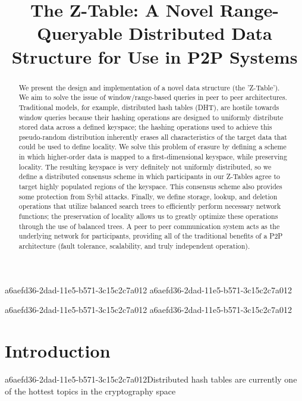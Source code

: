\documentclass[12pt]{article}
\title{The Z-Table: A Novel Range-Queryable Distributed Data Structure for Use in P2P Systems}
\begin{document}
\maketitle
a6aefd36-2dad-11e5-b571-3c15c2c7a012
a6aefd36-2dad-11e5-b571-3c15c2c7a012\begin{abstract}
We present the design and implementation of a novel data structure (the 'Z-Table'). We aim to solve the issue of window/range-based queries in peer to peer architectures. Traditional models, for example,  distributed hash tables (DHT), are hostile towards window queries because their hashing operations are designed to uniformly distribute stored data across a defined keyspace; the hashing operations used to achieve this pseudo-random distribution inherently erases all characteristics of the target data that could be used to define locality. We solve this problem of erasure by defining a scheme in which higher-order data is mapped to a first-dimensional keyspace, while preserving locality. The resulting keyspace is very definitely not uniformly distributed, so we define a distributed consensus scheme in which participants in our Z-Tables agree to target highly populated regions of the keyspace. This consensus scheme also provides some protection from Sybil attacks. Finally, we define storage, lookup, and deletion operations that utilize balanced search trees to efficiently perform necessary network functions; the preservation of locality allows us to greatly optimize these operations through the use of balanced trees. A peer to peer communication system acts as the underlying network for participants, providing all of the traditional benefits of a P2P architecture (fault tolerance, scalability, and truly independent operation).
\end{abstract}

a6aefd36-2dad-11e5-b571-3c15c2c7a012
\newpage
a6aefd36-2dad-11e5-b571-3c15c2c7a012\section{Introduction}
a6aefd36-2dad-11e5-b571-3c15c2c7a012Distributed hash tables are currently one of the hottest topics in the cryptography space~\cite{Stoica:2001dj,Rowstron:2001ea,Ratnasamy:2001wn}

\printbibliography
\end{document}
